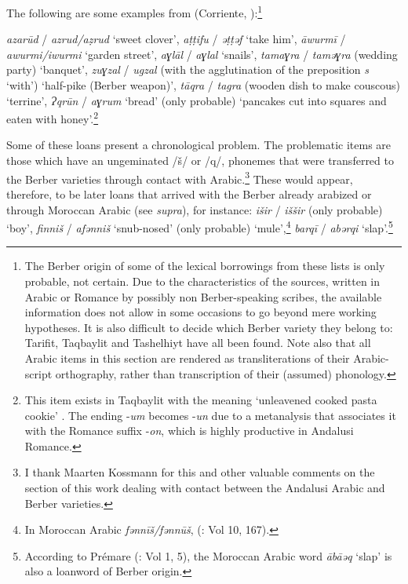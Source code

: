 \documentclass[output=paper,modfonts,nonflat]{langsci/langscibook}
\begin{document}
The following are some examples from (Corriente, \citealt{PereiraVicente2017}):\footnote{The Berber origin of some of the lexical borrowings from these lists is only probable, not certain. Due to the characteristics of the sources, written in Arabic or Romance by possibly non Berber-speaking scribes, the available information does not allow in some occasions to go beyond mere working hypotheses. It is also difficult to decide which Berber variety they belong to: Tarifit, Taqbaylit and Tashelhiyt have all been found. Note also that all Arabic items in this section are rendered as transliterations of their Arabic-script orthography, rather than transcription of their (assumed) phonology.} 

\textit{azarūd} / \textit{azrud/aẓrud} ‘sweet clover’, \textit{aṭṭifu} / \textit{ǝṭṭǝf} ‘take him’, \textit{āwurmī} / \textit{awurmi/iwurmi} ‘garden street’, \textit{aɣlāl} / \textit{aɣlal} ‘snails’, \textit{tamaɣra} / \textit{tamǝɣra} (wedding party) ‘banquet’, \textit{zuɣzal} / \textit{ugzal} ({with the agglutination of the preposition} \textit{s} ‘with’) ‘half-pike (Berber weapon)’, \textit{tāqra} / \textit{tagra} (wooden dish to make couscous) ‘terrine’, \textit{Ɂqrūn} / \textit{aɣrum} ‘bread’ (only probable) ‘pancakes cut into squares and eaten with honey’.\footnote{This item exists in Taqbaylit with the meaning ‘unleavened cooked pasta cookie’ \citep{Dallet1982}. The ending -\textit{um} becomes -\textit{un} due to a metanalysis that associates it with the Romance suffix -\textit{on}, which is highly productive in Andalusi Romance.} 

Some of these loans present a chronological problem. The problematic items are those which have an ungeminated /š/ or /q/, phonemes that were transferred to the Berber varieties through contact with Arabic.\footnote{I thank Maarten Kossmann for this and other valuable comments on the section of this work dealing with contact between the Andalusi Arabic and Berber varieties.} These would appear, therefore, to be later loans that arrived with the Berber already arabized or through Moroccan Arabic (see \textit{supra}), for instance: \textit{išir} / \textit{iššir} (only probable) ‘boy’, \textit{finniš} / \textit{afǝnniš} ‘snub-nosed’ (only probable) ‘mule’,\footnote{In Moroccan Arabic \textit{fǝnnīš/fənnūš}, (\citealt{Prémare1998}: Vol 10, 167).}  \textit{barqī} / \textit{abǝrqi} ‘slap’.\footnote{According to Prémare (\citealt{Prémare1993}: Vol 1, 5), the Moroccan Arabic word \textit{ābā{\R}ǝq} ‘slap’ is also a loanword of Berber origin.}
\end{document}
